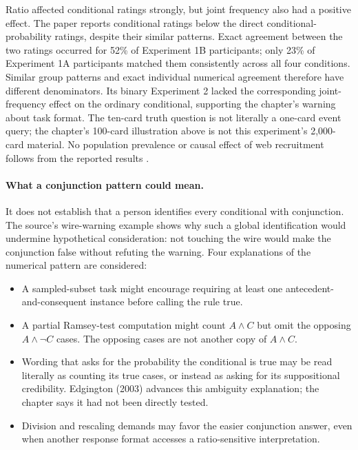 Ratio affected conditional ratings strongly, but joint frequency also
had a positive effect. The paper reports conditional ratings below the
direct conditional-probability ratings, despite their similar patterns.
Exact agreement between the two ratings occurred for 52\% of Experiment
1B participants; only 23\% of Experiment 1A participants matched them
consistently across all four conditions. Similar group patterns and exact
individual numerical agreement therefore have different denominators.
Its binary Experiment 2 lacked the corresponding joint-frequency effect
on the ordinary conditional, supporting the chapter's warning about task
format. The ten-card truth question is not literally a one-card event
query; the chapter's 100-card illustration above is not this experiment's
2,000-card material. No population prevalence or causal effect of web
recruitment follows from the reported results
\cite[pp.~682--686]{OberauerWilhelm2003MeaningsConditionals}.

\paragraph{What a conjunction pattern could mean.}
It does not establish that a person identifies every conditional with
conjunction. The source's wire-warning example shows why such a global
identification would undermine hypothetical consideration: not touching
the wire would make the conjunction false without refuting the warning.
Four explanations of the numerical pattern are considered:

\begin{itemize}
\item A sampled-subset task might encourage requiring at least one
      antecedent-and-consequent instance before calling the rule true.
\item A partial Ramsey-test computation might count \(A\land C\)
      but omit the opposing \(A\land\neg C\) cases. The opposing
      cases are not another copy of \(A\land C\).
\item Wording that asks for the probability the conditional is true may
      be read literally as counting its true cases, or instead as asking
      for its suppositional credibility. Edgington (2003) advances this
      ambiguity explanation; the chapter says it had not been directly tested.
\item Division and rescaling demands may favor the easier conjunction
      answer, even when another response format accesses a ratio-sensitive
      interpretation.
\end{itemize}

